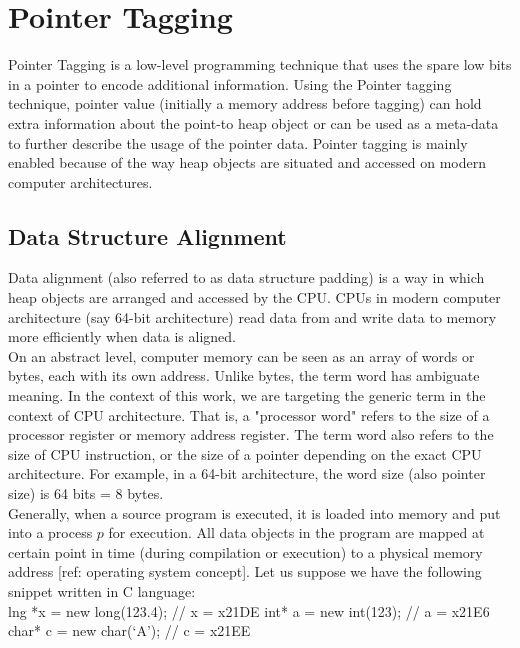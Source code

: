 \section{Pointer Tagging}
\label{sec:preliminaries:pointertagging}

Pointer Tagging is a low-level programming technique that uses the spare low bits in a pointer to encode additional information. Using the Pointer tagging technique, pointer value (initially a memory address before tagging) can hold extra information about the point-to heap object or can be used as a meta-data to further describe the usage of the pointer data. Pointer tagging is mainly enabled because of the way heap objects are situated and accessed on modern computer architectures.

\subsection{Data Structure Alignment}
\label{sec:data_alignment}
Data alignment (also referred to as data structure padding) is a way in which heap objects are arranged and accessed by the CPU. CPUs in modern computer architecture (say 64-bit architecture) read data from and write data to memory more efficiently when data is aligned.  \\

On an abstract level, computer memory can be seen as an array of words or bytes, each with its own address. Unlike bytes, the term word has ambiguate meaning. In the context of this work, we are targeting the generic term in the context of CPU architecture. That is, a "processor word" refers to the size of a processor register or memory address register. The term word also refers to the size of CPU instruction, or the size of a pointer depending on the exact CPU architecture. For example, in a 64-bit architecture, the word size (also pointer size) is 64 bits = 8 bytes. \\

Generally, when a source program is executed, it is loaded into memory and put into a process $p$ for execution. All data objects in the program are mapped at certain point in time (during compilation or execution) to a physical memory address [ref: operating system concept]. Let us suppose we have the following snippet written in C language: \\

lng *x = new long(123.4); // x = x21DE
int* a = new int(123);  // a = x21E6
char* c = new char(‘A’);  // c = x21EE

